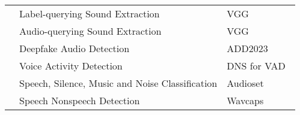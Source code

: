 \begin{longtable}{p{1cm}p{6cm}p{6cm}}
    & Label-querying Sound Extraction & VGG~\citep{chen2020vggsound} \\ \cline{2-3} %

    & Audio-querying Sound Extraction & VGG~\citep{chen2020vggsound}\\ \cline{2-3} %

    & Deepfake Audio Detection & ADD2023~\citep{yi2023add}\\ \cline{2-3} %

    & Voice Activity Detection & DNS for VAD~\citep{reddy2001interspeech} \\ \cline{2-3} %

    & Speech, Silence, Music and Noise Classification & Audioset~\citep{45857} \\ \cline{2-3} %

    & Speech Nonspeech Detection & Wavcaps~\citep{mei2023wavcaps}\\
\bottomrule

\end{longtable}